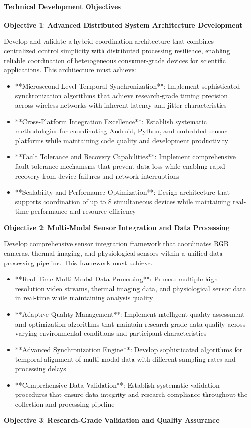 \documentclass[12pt,a4paper]{article}
\begin{document}
\paragraph{Technical Development Objectives}

\textbf{Objective 1: Advanced Distributed System Architecture Development}

Develop and validate a hybrid coordination architecture that combines centralized control simplicity with distributed
processing resilience, enabling reliable coordination of heterogeneous consumer-grade devices for scientific
applications. This architecture must achieve:

\begin{itemize}
\item **Microsecond-Level Temporal Synchronization**: Implement sophisticated synchronization algorithms that achieve
  research-grade timing precision across wireless networks with inherent latency and jitter characteristics
\item **Cross-Platform Integration Excellence**: Establish systematic methodologies for coordinating Android, Python, and
  embedded sensor platforms while maintaining code quality and development productivity
\item **Fault Tolerance and Recovery Capabilities**: Implement comprehensive fault tolerance mechanisms that prevent data
  loss while enabling rapid recovery from device failures and network interruptions
\item **Scalability and Performance Optimization**: Design architecture that supports coordination of up to 8 simultaneous
  devices while maintaining real-time performance and resource efficiency

\end{itemize}
\textbf{Objective 2: Multi-Modal Sensor Integration and Data Processing}

Develop comprehensive sensor integration framework that coordinates RGB cameras, thermal imaging, and physiological
sensors within a unified data processing pipeline. This framework must achieve:

\begin{itemize}
\item **Real-Time Multi-Modal Data Processing**: Process multiple high-resolution video streams, thermal imaging data, and
  physiological sensor data in real-time while maintaining analysis quality
\item **Adaptive Quality Management**: Implement intelligent quality assessment and optimization algorithms that maintain
  research-grade data quality across varying environmental conditions and participant characteristics
\item **Advanced Synchronization Engine**: Develop sophisticated algorithms for temporal alignment of multi-modal data with
  different sampling rates and processing delays
\item **Comprehensive Data Validation**: Establish systematic validation procedures that ensure data integrity and research
  compliance throughout the collection and processing pipeline

\end{itemize}
\textbf{Objective 3: Research-Grade Validation and Quality Assurance}
\end{document}
